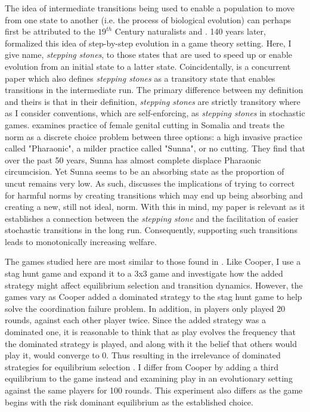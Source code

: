The idea of intermediate transitions being used to enable a population to move from one state to another (i.e. the process of biological evolution) can perhaps first be attributed to the $19^{th}$ Century naturalists \cite{wallace1858tendency} and \cite{darwin1859origin}. 140 years later, \cite{ellison2000basins} formalized this idea of step-by-step evolution in a game theory setting. Here, I give name, \textit{stepping stones}, to those states that are used to speed up or enable evolution from an initial state to a latter state. Coincidentally, \cite{gulesci2023stepping} is a concurrent paper which also defines \textit{stepping stones} as a transitory state that enables transitions in the intermediate run. The primary difference between my definition and theirs is that in their definition, \textit{stepping stones} are strictly transitory where as I consider conventions, which are self-enforcing, as \textit{stepping stones} in stochastic games. \cite{gulesci2023stepping} examines practice of female genital cutting in Somalia and treats the norm as a discrete choice problem between three options: a high invasive practice called "Pharaonic", a milder practice called "Sunna", or no cutting. They find that over the past 50 years, Sunna has almost complete displace Pharaonic circumcision. Yet Sunna seems to be an absorbing state as the proportion of uncut remains very low. As such, \cite{gulesci2023stepping} discusses the implications of trying to correct for harmful norms by creating transitions which may end up being absorbing and creating a new, still not ideal, norm. With this in mind, my paper is relevant as it establishes a connection between the \textit{stepping stone} and the facilitation of easier stochastic transitions in the long run. Consequently, supporting such transitions leads to monotonically increasing welfare.

The games studied here are most similar to those found in \cite{cooper1990selection}. Like Cooper, I use a stag hunt game and expand it to a 3x3 game and investigate how the added strategy might affect equilibrium selection and transition dynamics. However, the games vary as Cooper added a dominated strategy to the stag hunt game to help solve the coordination failure problem. In addition, in \cite{cooper1990selection} players only played 20 rounds, against each other player twice. Since the added strategy was a dominated one, it is reasonable to think that as play evolves the frequency that the dominated strategy is played, and along with it the belief that others would play it, would converge to 0. Thus resulting in the irrelevance of dominated strategies for equilibrium selection \citep{kohlberg1986strategic}. I differ from Cooper by adding a third equilibrium to the game instead and examining play in an evolutionary setting against the same players for 100 rounds. This experiment also differs as the game begins with the risk dominant equilibrium as the established choice.

